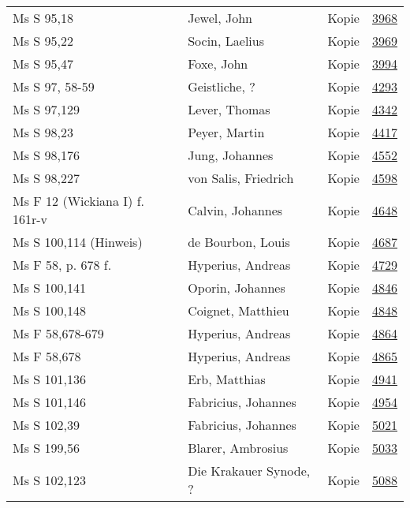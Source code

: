 \documentclass[10pt,a4paper,landscape]{report}
\begin{document}
\begin{longtable}{p{16cm}p{4cm}lr}
Ms S 95,18	&	Jewel, John	&	Kopie	&	\href{http://130.60.24.72/assignment/3968}{3968}\\
Ms S 95,22	&	Socin, Laelius	&	Kopie	&	\href{http://130.60.24.72/assignment/3969}{3969}\\
Ms S 95,47	&	Foxe, John	&	Kopie	&	\href{http://130.60.24.72/assignment/3994}{3994}\\
Ms S 97, 58-59	&	Geistliche, ?	&	Kopie	&	\href{http://130.60.24.72/assignment/4293}{4293}\\
Ms S 97,129	&	Lever, Thomas	&	Kopie	&	\href{http://130.60.24.72/assignment/4342}{4342}\\
Ms S 98,23	&	Peyer, Martin	&	Kopie	&	\href{http://130.60.24.72/assignment/4417}{4417}\\
Ms S 98,176	&	Jung, Johannes	&	Kopie	&	\href{http://130.60.24.72/assignment/4552}{4552}\\
Ms S 98,227	&	von Salis, Friedrich	&	Kopie	&	\href{http://130.60.24.72/assignment/4598}{4598}\\
Ms F 12 (Wickiana I) f. 161r-v	&	Calvin, Johannes	&	Kopie	&	\href{http://130.60.24.72/assignment/4648}{4648}\\
Ms S 100,114 (Hinweis)	&	de Bourbon, Louis	&	Kopie	&	\href{http://130.60.24.72/assignment/4687}{4687}\\
Ms F 58, p. 678 f.	&	Hyperius, Andreas	&	Kopie	&	\href{http://130.60.24.72/assignment/4729}{4729}\\
Ms S 100,141	&	Oporin, Johannes	&	Kopie	&	\href{http://130.60.24.72/assignment/4846}{4846}\\
Ms S 100,148	&	Coignet, Matthieu	&	Kopie	&	\href{http://130.60.24.72/assignment/4848}{4848}\\
Ms F 58,678-679	&	Hyperius, Andreas	&	Kopie	&	\href{http://130.60.24.72/assignment/4864}{4864}\\
Ms F 58,678	&	Hyperius, Andreas	&	Kopie	&	\href{http://130.60.24.72/assignment/4865}{4865}\\
Ms S 101,136	&	Erb, Matthias	&	Kopie	&	\href{http://130.60.24.72/assignment/4941}{4941}\\
Ms S 101,146	&	Fabricius, Johannes	&	Kopie	&	\href{http://130.60.24.72/assignment/4954}{4954}\\
Ms S 102,39	&	Fabricius, Johannes	&	Kopie	&	\href{http://130.60.24.72/assignment/5021}{5021}\\
Ms S 199,56	&	Blarer, Ambrosius	&	Kopie	&	\href{http://130.60.24.72/assignment/5033}{5033}\\
Ms S 102,123	&	Die Krakauer Synode, ?	&	Kopie	&	\href{http://130.60.24.72/assignment/5088}{5088}\\

\end{longtable}
\end{document}
